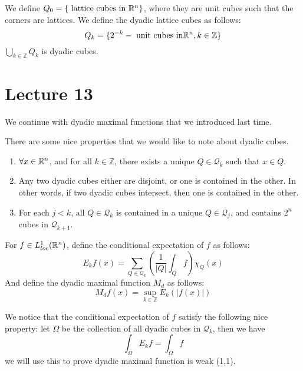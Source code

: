 \begin{definition}
    We define $Q_0=\{\text{ lattice cubes in } \mathbb{R}^n\}$, where they are unit cubes such that the corners are lattices. We define the dyadic lattice cubes as follows:
    \begin{equation*}
        Q_k=\{ 2^{-k}-\text{ unit cubes in} \mathbb{R}^n, k\in\mathbb{Z}\}
    \end{equation*}
    $\bigcup_{k\in\mathbb{Z}}Q_k$ is dyadic cubes.
\end{definition}

\section{Lecture 13}
We continue with dyadic maximal functions that we introduced last time.

There are some nice properties that we would like to note about dyadic cubes.
\begin{enumerate}
    \item $\forall x\in\mathbb{R}^n$, and for all $k\in\mathbb{Z}$, there exists a unique $Q\in\mathcal{Q}_k$ such that $x\in Q$.
    \item Any two dyadic cubes either are disjoint, or one is contained in the other. In other words, if two dyadic cubes intersect, then one is contained in the other.
    \item For each $j<k$, all $Q\in\mathcal{Q}_k$ is contained in a unique $Q\in\mathcal{Q}_j$, and contains $2^n$ cubes in $\mathcal{Q}_{k+1}$.
\end{enumerate}

\begin{definition}
    For $f\in L_{loc}^1(\mathbb{R}^n)$, define the conditional expectation of $f$ as follows:
    \begin{equation*}
        E_kf(x)=\sum_{Q\in \mathcal{Q}_k}\left(\frac{1}{|Q|}\int_Qf\right)\chi_{Q}(x)
    \end{equation*}
    And define the dyadic maximal function $M_d$ as follows:
    \begin{equation*}
        M_df(x)=\sup_{k\in\mathbb{Z}}E_k(|f(x)|)
    \end{equation*}

\end{definition}
\begin{note}
    We notice that the conditional expectation of $f$ satisfy the following nice property: let $\Omega$ be the collection of all dyadic cubes in $\mathcal{Q}_k$, then we have
    \begin{equation*}
        \int_\Omega E_kf=\int_\Omega f
    \end{equation*}
    we will use this to prove dyadic maximal function is weak (1,1).
\end{note}

